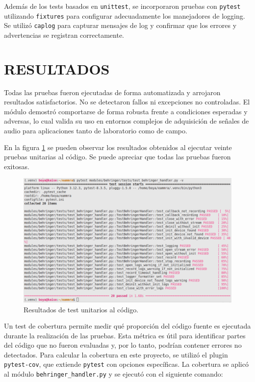 Además de los tests basados en \texttt{unittest}, se incorporaron pruebas con \texttt{pytest} utilizando \texttt{fixtures} para configurar adecuadamente los manejadores de logging. Se utilizó \texttt{caplog} para capturar mensajes de log y confirmar que los errores y advertencias se registran correctamente.

\section{RESULTADOS}

Todas las pruebas fueron ejecutadas de forma automatizada y arrojaron resultados satisfactorios. No se detectaron fallos ni excepciones no controladas. El módulo demostró comportarse de forma robusta frente a condiciones esperadas y adversas, lo cual valida su uso en entornos complejos de adquisición de señales de audio para aplicaciones tanto de laboratorio como de campo.

En la figura \ref{fig:testUni} se pueden observar los resultados obtenidos al ejecutar veinte pruebas unitarias al código.  Se puede apreciar que todas las pruebas fueron exitosas. 

\begin{figure}[htpb]
    \centering
    \includegraphics[width=\textwidth]{graficos/unittest.png}
    \caption{Resultados de test unitarios al código.}
    \label{fig:testUni}
\end{figure}

Un test de cobertura permite medir qué proporción del código fuente es ejecutada durante la realización de las pruebas. Esta métrica es útil para identificar partes del código que no fueron evaluadas y, por lo tanto, podrían contener errores no detectados. Para calcular la cobertura en este proyecto, se utilizó el plugin \texttt{pytest-cov}, que extiende \texttt{pytest} con opciones específicas. La cobertura se aplicó al módulo \texttt{behringer\_handler.py} y se ejecutó con el siguiente comando:

